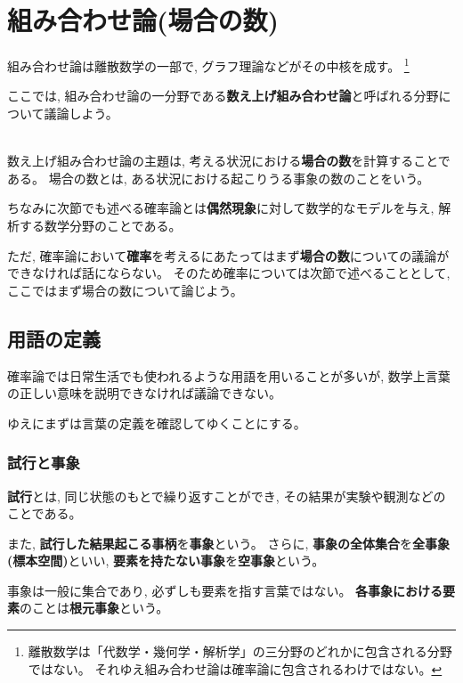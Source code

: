 \documentclass[a4j,  9pt]{ltjsarticle}
\begin{document}
  \section{組み合わせ論(場合の数)}
    組み合わせ論は離散数学の一部で, グラフ理論などがその中核を成す。
    \footnote{
      離散数学は「代数学・幾何学・解析学」の三分野のどれかに包含される分野ではない。
      それゆえ組み合わせ論は確率論に包含されるわけではない。
    }
    
    ここでは, 組み合わせ論の一分野である\textbf{数え上げ組み合わせ論}と呼ばれる分野について議論しよう。

    \vspace{9pt}\\

    数え上げ組み合わせ論の主題は, 考える状況における\textbf{場合の数}を計算することである。
    場合の数とは, ある状況における起こりうる事象の数のことをいう。\par
    ちなみに次節でも述べる確率論とは\textbf{偶然現象}に対して数学的なモデルを与え, 解析する数学分野のことである。\par
    ただ, 確率論において\textbf{確率}を考えるにあたってはまず\textbf{場合の数}についての議論ができなければ話にならない。
    そのため確率については次節で述べることとして, ここではまず場合の数について論じよう。

    \subsection{用語の定義}
      確率論では日常生活でも使われるような用語を用いることが多いが, 数学上言葉の正しい意味を説明できなければ議論できない。\par
      ゆえにまずは言葉の定義を確認してゆくことにする。

      \subsubsection{試行と事象}
        \textbf{試行}とは, 同じ状態のもとで繰り返すことができ, その結果が実験や観測などのことである。\par
        また, \textbf{試行した結果起こる事柄}を\textbf{事象}という。
        さらに, \textbf{事象の全体集合}を\textbf{全事象(標本空間)}といい, \textbf{要素を持たない事象}を\textbf{空事象}という。\par
        事象は一般に集合であり, 必ずしも要素を指す言葉ではない。
        \textbf{各事象における要素}のことは\textbf{根元事象}という。
\end{document}
